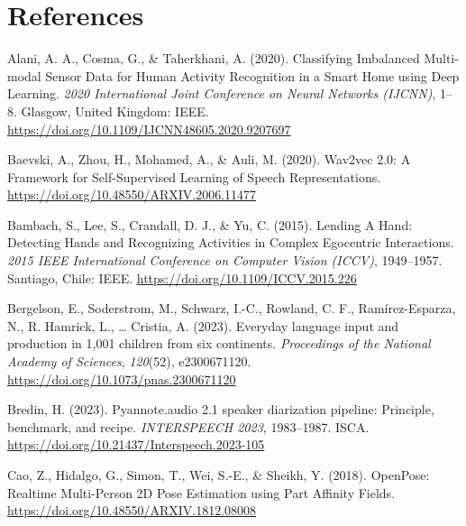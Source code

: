 \documentclass[
  man,floatsintext]{apa6}
\newlength{\cslhangindent}
\newenvironment{CSLReferences}[2] %
 {\begin{list}{}{%
  \setlength{\itemindent}{0pt}
  \setlength{\leftmargin}{0pt}
  \setlength{\parsep}{0pt}
  \ifodd #1
   \setlength{\leftmargin}{\cslhangindent}
   \setlength{\itemindent}{-1\cslhangindent}
  \fi
  \setlength{\itemsep}{#2\baselineskip}}}
 {\end{list}}
\begin{document}
\newpage

\section{References}\label{references}

\begingroup
\setlength{\parindent}{-0.5in}
\setlength{\leftskip}{0.5in}

\label{refs}
\begin{CSLReferences}{1}{0}
Alani, A. A., Cosma, G., \& Taherkhani, A. (2020). Classifying {Imbalanced Multi-modal Sensor Data} for {Human Activity Recognition} in a {Smart Home} using {Deep Learning}. \emph{2020 {International Joint Conference} on {Neural Networks} ({IJCNN})}, 1--8. Glasgow, United Kingdom: IEEE. \url{https://doi.org/10.1109/IJCNN48605.2020.9207697}

Baevski, A., Zhou, H., Mohamed, A., \& Auli, M. (2020). Wav2vec 2.0: {A Framework} for {Self-Supervised Learning} of {Speech Representations}. \url{https://doi.org/10.48550/ARXIV.2006.11477}

Bambach, S., Lee, S., Crandall, D. J., \& Yu, C. (2015). Lending {A Hand}: {Detecting Hands} and {Recognizing Activities} in {Complex Egocentric Interactions}. \emph{2015 {IEEE International Conference} on {Computer Vision} ({ICCV})}, 1949--1957. Santiago, Chile: IEEE. \url{https://doi.org/10.1109/ICCV.2015.226}

Bergelson, E., Soderstrom, M., Schwarz, I.-C., Rowland, C. F., Ramírez-Esparza, N., R. Hamrick, L., \ldots{} Cristia, A. (2023). Everyday language input and production in 1,001 children from six continents. \emph{Proceedings of the National Academy of Sciences}, \emph{120}(52), e2300671120. \url{https://doi.org/10.1073/pnas.2300671120}

Bredin, H. (2023). Pyannote.audio 2.1 speaker diarization pipeline: Principle, benchmark, and recipe. \emph{{INTERSPEECH} 2023}, 1983--1987. ISCA. \url{https://doi.org/10.21437/Interspeech.2023-105}

Cao, Z., Hidalgo, G., Simon, T., Wei, S.-E., \& Sheikh, Y. (2018). {OpenPose}: {Realtime Multi-Person 2D Pose Estimation} using {Part Affinity Fields}. \url{https://doi.org/10.48550/ARXIV.1812.08008}


\end{CSLReferences}
\end{document}
